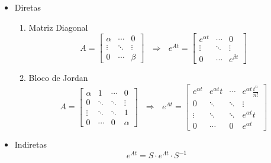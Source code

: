 \documentclass[11pt, a4paper]{article}
\begin{document}
\begin{itemize}
    \item Diretas
    \begin{enumerate}
        \item Matriz Diagonal
        \begin{equation*}
            A = \left[\begin{matrix}
                \alpha & \cdots & 0 \\
                \vdots & \ddots & \vdots \\
                0 & \cdots & \beta 
            \end{matrix}\right] 
            \ \ \ \Rightarrow\ \ \ 
            e^{At} = \left[\begin{matrix}
                e^{\alpha t} & \cdots & 0 \\
                \vdots & \ddots & \vdots \\
                0 & \cdots & e^{\beta t} 
            \end{matrix}\right]
        \end{equation*}
        \item Bloco de Jordan
        \begin{equation*}
            A = \left[\begin{matrix}
                \alpha & 1 & \cdots & 0 \\
                0 & \ddots & \ddots & \vdots \\
                \vdots & \ddots & \ddots & 1 \\
                0 & \cdots & 0 & \alpha 
            \end{matrix}\right]
            \ \ \ \Rightarrow\ \ \ 
            e^{At} = \left[\begin{matrix}
                e^{\alpha t} & e^{\alpha t}t & \cdots & e^{\alpha t}\frac{t^n}{n!} \\
                0 & \ddots & \ddots & \vdots \\
                \vdots & \ddots & \ddots & e^{\alpha t}t \\
                0 & \cdots & 0 & e^{\alpha t}
            \end{matrix}\right]
        \end{equation*}
    \end{enumerate}
    \item Indiretas
    \begin{equation*}
        e^{At} = S \cdot e^{\Lambda t} \cdot S^{-1}
    \end{equation*}

\end{itemize}
\end{document}
